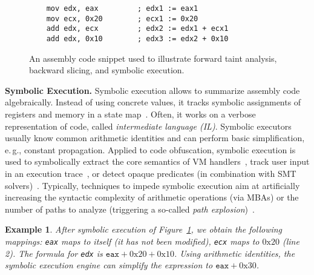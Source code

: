 \documentclass[letterpaper,twocolumn,10pt]{article}
\newcommand{\eg}{e.\,g.,\xspace}
\theoremstyle{customexample}
\newtheorem{example}{Example}
\theoremstyle{customexperiment}
\begin{document}
\begin{figure}[tp]
\begin{verbatim}
    mov edx, eax         ; edx1 := eax1
    mov ecx, 0x20        ; ecx1 := 0x20
    add edx, ecx         ; edx2 := edx1 + ecx1
    add edx, 0x10        ; edx3 := edx2 + 0x10
\end{verbatim}
\caption{An assembly code snippet used to illustrate forward taint analysis, backward slicing, and symbolic execution.}\label{fig:codesnippet}\vspace{-1.5em}
\end{figure}

\textbf{Symbolic Execution.}
Symbolic execution allows to summarize assembly code algebraically. Instead of using concrete values, it tracks symbolic assignments of registers and memory in a state map~\cite{schwartz2010all}. Often, it works on a verbose representation of code, called \emph{intermediate language (IL)}.
Symbolic executors usually know common arithmetic identities and can perform basic simplification, \eg constant propagation. 
Applied to code obfuscation, symbolic execution is used to symbolically extract the core semantics of VM handlers~\cite{liang2017deobfuscation}, track user input in an execution trace~\cite{yadegari2015symbolic,yadegari2015generic,salwan2018symbolic}, or detect opaque predicates (in combination with SMT solvers)~\cite{bardin2017backward}. Typically, techniques to impede symbolic execution aim at artificially increasing the syntactic complexity of arithmetic operations (via MBAs) or the number of paths to analyze (triggering a so-called \emph{path explosion})~\cite{ollivier2019howto,banescu2016code}.
\begin{example}
After symbolic execution of Figure~\ref{fig:codesnippet}, we obtain the following mappings: \texttt{eax} maps to itself (it has not been modified), \texttt{ecx} maps to $\mathrm{0x20}$ (line 2). The  formula for \texttt{edx} is $\texttt{eax} + \mathrm{0x20} + \mathrm{0x10}$. Using arithmetic identities, the symbolic execution engine can simplify the expression to $\texttt{eax} + \mathrm{0x30}$.
\end{example}
\end{document}
